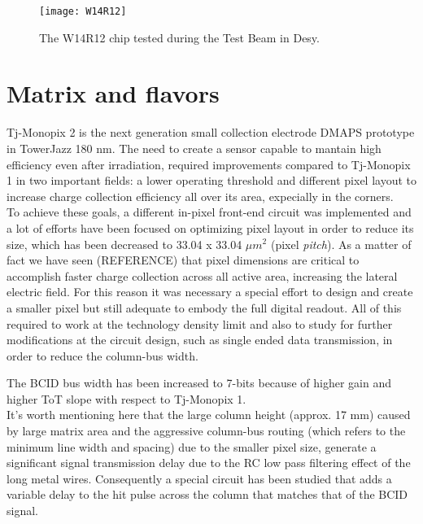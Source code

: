 \begin{figure}[h!]
\centering
\texttt{[image: W14R12]}
\caption{The W14R12 chip tested during the Test Beam in Desy.}
\label{fig:w14r12}
\end{figure}




\section{Matrix and flavors}



Tj-Monopix 2 is the next generation small collection electrode DMAPS prototype in TowerJazz 180 nm. The need to create a sensor capable to mantain high efficiency even after irradiation, required improvements compared to Tj-Monopix 1 in two important fields: a lower operating threshold and different pixel layout to increase charge collection efficiency all over its area, expecially in the corners.\\

To achieve these goals, a different in-pixel front-end circuit was implemented and a lot of efforts have been focused on optimizing pixel layout in order to reduce its size, which has been decreased to 33.04 x 33.04 $\mu m^{2}$ (pixel \textit{pitch}). As a matter of fact we have seen (REFERENCE) that pixel dimensions are critical to accomplish faster charge collection across all active area, increasing the lateral electric field. For this reason it was necessary a special effort to design and create a smaller pixel but still adequate to embody the full digital readout. All of this required to work at the technology density limit and also to study for further modifications at the circuit design, such as single ended data transmission, in order to reduce the column-bus width.

The BCID bus width has been increased  to 7-bits because of higher gain and higher ToT slope with respect to Tj-Monopix 1. \\
It's worth mentioning here that the large column height (approx. 17 mm) caused by large matrix area and the aggressive column-bus routing (which refers to the minimum line width and spacing) due to the smaller pixel size, generate a significant signal transmission delay due to the RC low pass filtering effect of the long metal wires. Consequently a special circuit has been studied that adds a variable delay to the hit pulse across the column that matches that of the BCID signal.


